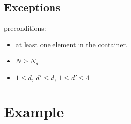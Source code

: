 \subsection{Exceptions}
preconditions:
\begin{itemize}
\item
at least one element in the container.
\item
$N \geq N_d$
\item
$1 \leq d$, $d' \leq d$, $1 \leq d' \leq 4$ 
\end{itemize}	
 

\section{Example}
